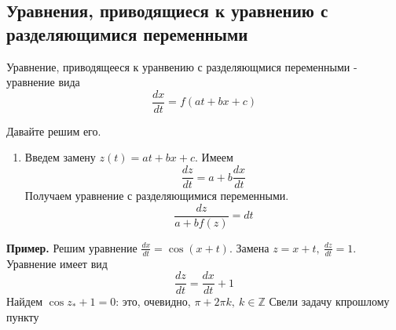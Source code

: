\subsection{Уравнения, приводящиеся к уравнению с разделяющимися переменными}
\begin{defin}
Уравнение, приводящееся к уранвению с разделяющмися переменными - уравнение
вида 
\begin{equation}
    \frac{dx}{dt}=f(at+bx+c) \label{ODE_privrazd}
\end{equation}
\end{defin}
Давайте решим его. 
\begin{enumerate}
    \item Введем замену $z(t)=at+bx+c$. 
    Имеем
     $$\frac{dz}{dt}=a+b\frac{dx}{dt}$$ 
     Получаем уравнение с разделяющимися переменными. 
     $$\frac{dz}{a+bf(z)}=dt$$
\end{enumerate}
\textbf{Пример.} Решим уравнение $\frac{dx}{dt}=\cos(x+t)$. Замена 
$z=x+t,~ \frac{dz}{dt}=1$. Уравнение имеет вид
$$\frac{dz}{dt}=\frac{dx}{dt}+1$$ 
Найдем $\cos{z_*}+1=0$: это, очевидно, $\pi+2\pi k,~k\in \mathbb{Z}$ 
Свели задачу кпрошлому пункту
